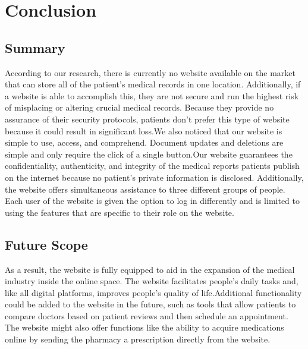 \documentclass[a4paper, 12pt]{report}
\begin{document}
\chapter{Conclusion}
\section{Summary}
\par According to our research, there is currently no website available on the market that can store all of the patient's medical records in one location. Additionally, if a website is able to accomplish this, they are not secure and run the highest risk of misplacing or altering crucial medical records. Because they provide no assurance of their security protocols, patients don't prefer this type of website because it could result in significant loss.We also noticed that our website is simple to use, access, and comprehend. Document updates and deletions are simple and only require the click of a single button.Our website guarantees the confidentiality, authenticity, and integrity of the medical reports patients publish on the internet because no patient's private information is disclosed. Additionally, the website offers simultaneous assistance to three different groups of people. Each user of the website is given the option to log in differently and is limited to using the features that are specific to their role on the website.
\section{Future Scope}
\par As a result, the website is fully equipped to aid in the expansion of the medical industry inside the online space. The website facilitates people's daily tasks and, like all digital platforms, improves people's quality of life.Additional functionality could be added to the website in the future, such as tools that allow patients to compare doctors based on patient reviews and then schedule an appointment. The website might also offer functions like the ability to acquire medications online by sending the pharmacy a prescription directly from the website.
\end{document}
